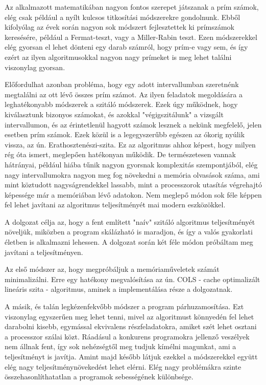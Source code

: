 \documentclass[twoside, a4paper, 12pt]{article}
\begin{document}
Az alkalmazott matematikában nagyon fontos szerepet játszanak a prím számok, elég csak például a nyílt kulcsos titkosítási módszerekre gondolnunk. Ebből kifolyólag az évek során nagyon sok módszert fejlesztettek ki prímszámok keresésére, például a Fermat-teszt, vagy a Miller-Rabin teszt. Ezen módszerekkel elég gyorsan el lehet dönteni egy darab számról, hogy prím-e vagy sem, és így ezért az ilyen algoritmusokkal nagyon nagy prímeket is meg lehet találni viszonylag gyorsan. \par
Előfordulhat azonban probléma, hogy egy adott intervallumban szeretnénk megtalálni az ott lévő összes prím számot. Az ilyen feladatok megoldására a leghatékonyabb módszerek a szitáló módszerek. Ezek úgy működnek, hogy kiválasztunk bizonyos számokat, és azokkal "végigszitálunk" a vizsgált intervallumon, és az érintetlenül hagyott számok lesznek a nekünk megfelelő, jelen esetben prím számok. Ezek közül is a legegyszerűbb egészen az ókorig nyúlik vissza, az ún. Erathosztenészi-szita. Ez az algoritmus ahhoz képest, hogy milyen rég óta ismert, meglepően hatékonyan működik. De természetesen vannak hátrányai, például hiába tűnik nagyon gyorsnak komplexitás szempontjából, elég nagy intervallumokra nagyon meg fog növekedni a memória olvasások száma, ami mint köztudott nagyságrendekkel lassabb, mint a processzorok utasítás végrehajtó képessége már a memóriában lévő adatokon. Nem meglepő módon sok féle képpen fel lehet javítani az algoritmus teljesítményét mai modern eszközökkel. \par
A dolgozat célja az, hogy a fent említett "naív" szitáló algoritmus teljesítményét növeljük, miközben a program skálázható is maradjon, és így a valós gyakorlati életben is alkalmazni lehessen. A dolgozat során két féle módon próbáltam meg javítani a teljesítményen.\par
Az első módszer az, hogy megpróbáljuk a memóriaműveletek számát minimalizálni. Erre egy hatékony megvalósítása az ún. COLS - cache optimalizált lineáris szita - algoritmus, aminek a implementálása része a dolgozatnak. \par \cite{COLS} \cite{COLS2}
A másik, és talán legkézenfekvőbb módszer a program párhuzamosítása. Ezt viszonylag egyszerűen meg lehet tenni, mivel az algoritmust könnyedén fel lehet darabolni kisebb, egymással ekvivalens részfeladatokra, amiket szét lehet osztani a processzor szálai közt. Ráadásul a konkurens programokra jellenző veszélyek nem állnak fent, így sok nehézségtől meg tudjuk kímélni magunkat, ami a teljesítményt is javítja. Amint majd később látjuk ezekkel a módszerekkel együtt elég nagy teljesítménynövekedést lehet elérni. Elég nagy problémákra szinte összehasonlíthatatlan a programok sebességének különbsége.\par
\end{document}
